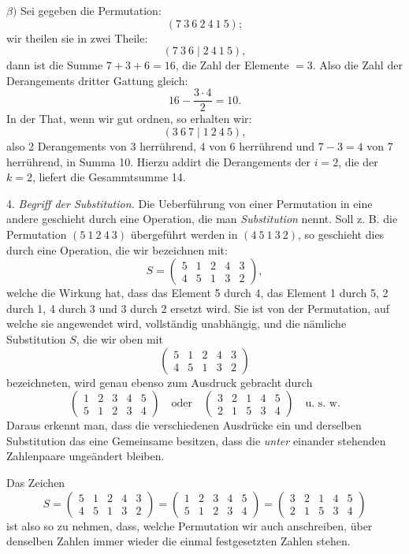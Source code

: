 \documentclass[10pt]{article}
\begin{document}
\(\beta)\) Sei gegeben die Permutation:
\[
(7\ 3\ 6\ 2\ 4\ 1\ 5);
\]
wir theilen sie in zwei Theile:
\[
(7\ 3\ 6\mid2\ 4\ 1\ 5),
\]
dann ist die Summe \(7+3+6=16\), die Zahl der Elemente \(=3\). Also die Zahl der Derangements dritter Gattung gleich:
\[
16-\frac{3\cdot4}{2}=10.
\]
In der That, wenn wir gut ordnen, so erhalten wir:
\[
(3\ 6\ 7\mid1\ 2\ 4\ 5),
\]
also 2 Derangements von 3 herrührend, 4 von 6 herrührend und \(7-3=4\) von 7 herrührend, in Summa 10. Hierzu addirt die Derangements der \(i=2\), die der \(k=2\), liefert die Gesammtsumme 14.

4. \emph{Begriff der Substitution.} Die Ueberführung von einer Permutation in eine andere geschieht durch eine Operation, die man \emph{Substitution} nennt. Soll z. B. die Permutation \((5\ 1\ 2\ 4\ 3)\) übergeführt werden in \((4\ 5\ 1\ 3\ 2)\), so geschieht dies durch eine Operation, die wir bezeichnen mit:
\[
S=\begin{pmatrix}5&1&2&4&3\\4&5&1&3&2\end{pmatrix},
\]
welche die Wirkung hat, dass das Element 5 durch 4, das Element 1 durch 5, 2 durch 1, 4 durch 3 und 3 durch 2 ersetzt wird. Sie ist von der Permutation, auf welche sie angewendet wird, vollständig unabhängig, und die nämliche Substitution \(S\), die wir oben mit
\[
\begin{pmatrix}5&1&2&4&3\\4&5&1&3&2\end{pmatrix}
\]
bezeichneten, wird genau ebenso zum Ausdruck gebracht durch
\[
\begin{pmatrix}1&2&3&4&5\\5&1&2&3&4\end{pmatrix}
\quad\text{oder}\quad
\begin{pmatrix}3&2&1&4&5\\2&1&5&3&4\end{pmatrix}
\quad\text{u. s. w.}
\]
Daraus erkennt man, dass die verschiedenen Ausdrücke ein und derselben Substitution das eine Gemeinsame besitzen, dass die \emph{unter} einander stehenden Zahlenpaare ungeändert bleiben.

Das Zeichen
\[
S=
\begin{pmatrix}5&1&2&4&3\\4&5&1&3&2\end{pmatrix}
=
\begin{pmatrix}1&2&3&4&5\\5&1&2&3&4\end{pmatrix}
=
\begin{pmatrix}3&2&1&4&5\\2&1&5&3&4\end{pmatrix}
\]
ist also so zu nehmen, dass, welche Permutation wir auch anschreiben, über denselben Zahlen immer wieder die einmal festgesetzten Zahlen stehen.
\end{document}
